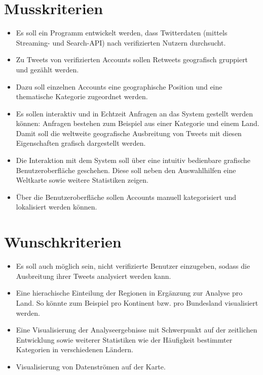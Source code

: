 
\section{Musskriterien}
\begin{itemize}
	\item Es soll ein Programm entwickelt werden, dass Twitterdaten (mittels Streaming- und Search-API) nach verifizierten Nutzern durchsucht.
	\item Zu Tweets von verifizierten Accounts sollen Retweets geografisch gruppiert und gezählt werden.
	\item Dazu soll einzelnen Accounts eine geographische Position und eine thematische Kategorie zugeordnet werden.
	\item Es sollen interaktiv und in Echtzeit Anfragen an das System gestellt werden können: Anfragen bestehen zum Beispiel aus einer Kategorie und einem Land. Damit soll die weltweite geografische Ausbreitung von Tweets mit diesen Eigenschaften grafisch dargestellt werden.
	\item Die Interaktion mit dem System soll über eine intuitiv bedienbare grafische Benutzeroberfläche geschehen. Diese soll neben den Auswahlhilfen eine Weltkarte sowie weitere Statistiken zeigen.
	\item Über die Benutzeroberfläche sollen Accounts manuell kategorisiert und lokalisiert werden können.
\end{itemize}

\section{Wunschkriterien}
\begin{itemize}
	\item Es soll auch möglich sein, nicht verifizierte Benutzer einzugeben, sodass die Ausbreitung ihrer Tweets analysiert werden kann.
	\item Eine hierachische Einteilung der Regionen in Ergänzung zur Analyse pro Land. So könnte zum Beispiel pro Kontinent bzw. pro Bundesland visualisiert werden.
	\item Eine Visualisierung der Analyseergebnisse mit Schwerpunkt auf der zeitlichen Entwicklung sowie weiterer Statistiken wie der Häufigkeit bestimmter Kategorien in verschiedenen Ländern.
	\item Visualisierung von Datenströmen auf der Karte.
\end{itemize}

